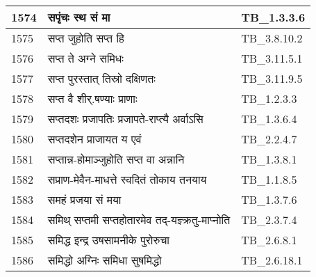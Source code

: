 \documentclass[17pt]{extarticle}
\begin{document}
\begin{longtable}{||p{0.4in}||p{4.9in}||p{0.9in}||}
    \hline
        
    1574 & सपृंचः स्थ सं मा & TB\_1.3.3.6       \\
    
    \hline
        
    1575 & सप्त जुहोति सप्त हि & TB\_3.8.10.2       \\
    
    \hline
        
    1576 & सप्त ते अग्ने समिधः & TB\_3.11.5.1       \\
    
    \hline
        
    1577 & सप्त पुरस्तात् तिस्रो दक्षिणतः & TB\_3.11.9.5       \\
    
    \hline
        
    1578 & सप्त वै शीर्.षण्याः प्राणाः & TB\_1.2.3.3       \\
    
    \hline
        
    1579 & सप्तदशः प्रजापतिः प्रजापते{-}राप्त्यै अर्वाऽसि & TB\_1.3.6.4       \\
    
    \hline
        
    1580 & सप्तदशेन प्राजायत य एवं & TB\_2.2.4.7       \\
    
    \hline
        
    1581 & सप्तान्न{-}होमाञ्जुहोति सप्त वा अन्नानि & TB\_1.3.8.1       \\
    
    \hline
        
    1582 & सप्राण{-}मेवैन{-}माधत्ते स्वदितं तोकाय तनयाय & TB\_1.1.8.5       \\
    
    \hline
        
    1583 & समहं प्रजया सं मया & TB\_1.3.7.6       \\
    
    \hline
        
    1584 & समिथ् सप्तमी सप्तहोतारमेव तद्{-}यज्ञ्क्रतु{-}माप्नोति & TB\_2.3.7.4       \\
    
    \hline
        
    1585 & समिद्ध इन्द्र उषसामनीके पुरोरुचा & TB\_2.6.8.1       \\
    
    \hline
        
    1586 & समिद्धो अग्निः समिधा सुषमिद्धो & TB\_2.6.18.1       \\
    

\end{longtable}
\end{document}
